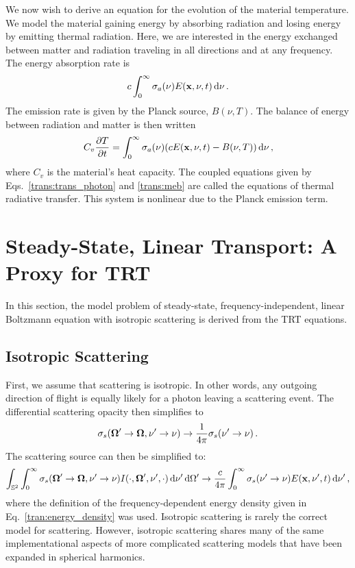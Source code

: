 \documentclass[../doc.tex]{subfiles}
\begin{document}
We now wish to derive an equation for the evolution of the material temperature. We model the material gaining energy by absorbing radiation and losing energy by emitting thermal radiation. Here, we are interested in the energy exchanged between matter and radiation traveling in all directions and at any frequency. 
The energy absorption rate is 
	\begin{equation}
		c\int_0^\infty \sigma_a(\nu) E(\boldsymbol{\mathrm{x}},\nu,t) \mathop{}\!\mathrm{d} \nu \,. 
	\end{equation}
The emission rate is given by the Planck source, $B(\nu,T)$.
The balance of energy between radiation and matter is then written 
	\begin{equation} \label{trans:meb}
		C_v \frac{\partial T}{\partial t} = \int_0^\infty \sigma_a(\nu) (c E(\boldsymbol{\mathrm{x}},\nu,t) - B(\nu,T)) \mathop{}\!\mathrm{d} \nu\,, 
	\end{equation}
where $C_v$ is the material's heat capacity. The coupled equations given by Eqs.~\ref{trans:trans_photon} and \ref{trans:meb} are called the equations of thermal radiative transfer. This system is nonlinear due to the Planck emission term. 

\section{Steady-State, Linear Transport: A Proxy for TRT}
In this section, the model problem of steady-state, frequency-independent, linear Boltzmann equation with isotropic scattering is derived from the TRT equations. 

\subsection{Isotropic Scattering}
First, we assume that scattering is isotropic. In other words, any outgoing direction of flight is equally likely for a photon leaving a scattering event. The differential scattering opacity then simplifies to 
	\begin{equation}
		\sigma_s(\boldsymbol{\Omega}'\rightarrow\boldsymbol{\Omega},\nu'\rightarrow\nu) \rightarrow \frac{1}{4\pi}\sigma_s(\nu'\rightarrow \nu) \,. 
	\end{equation}
The scattering source can then be simplified to: 
	\begin{equation}
		\int_{\mathbb{S}^2} \int_0^\infty \sigma_s(\boldsymbol{\Omega}'\rightarrow\boldsymbol{\Omega},\nu'\rightarrow \nu) I(\cdot,\boldsymbol{\Omega}',\nu',\cdot) \mathop{}\!\mathrm{d} \nu'\mathop{}\!\mathrm{d}\Omega' \rightarrow \frac{c}{4\pi} \int_0^\infty \sigma_s(\nu'\rightarrow\nu) E(\boldsymbol{\mathrm{x}},\nu',t) \mathop{}\!\mathrm{d} \nu' \,, 
	\end{equation}
where the definition of the frequency-dependent energy density given in Eq.~\ref{tran:energy_density} was used. Isotropic scattering is rarely the correct model for scattering. However, isotropic scattering shares many of the same implementational aspects of more complicated scattering models that have been expanded in spherical harmonics. 
\end{document}
